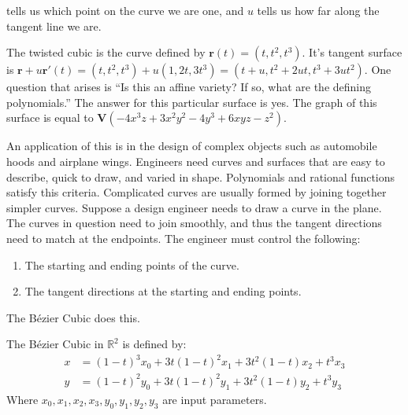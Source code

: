                 tells us which point on the curve we are one, and $u$
                tells us how far along the tangent line we are.
                \begin{example}
                    The twisted cubic is the curve defined by
                    $\mathbf{r}(t)=(t,t^2,t^3)$. It's tangent surface is
                    $\mathbf{r}+u\mathbf{r}'(t)%
                     =(t,t^2,t^3)+u(1,2t,3t^3)%
                     =(t+u,t^2+2ut,t^3+3ut^2)$.
                    One question that arises is ``Is this an affine variety?
                    If so, what are the defining polynomials.''
                    The answer for this particular surface is yes.
                    The graph of this surface is equal to
                    $\mathbf{V}(-4x^3z+3x^2y^2-4y^3+6xyz-z^2)$.
                \end{example}
                An application of this is in the design of
                complex objects such as automobile hoods and
                airplane wings. Engineers need curves and surfaces
                that are easy to describe, quick to draw, and varied
                in shape. Polynomials and rational functions satisfy
                this criteria. Complicated curves are usually
                formed by joining together simpler curves. Suppose
                a design engineer needs to draw a curve in the plane.
                The curves in question need to join smoothly, and
                thus the tangent directions need to match at the
                endpoints. The engineer must control the following:
                \begin{enumerate}
                    \item The starting and ending
                          points of the curve.
                    \item The tangent directions
                          at the starting and ending points.
                \end{enumerate}
                The B\'{e}zier Cubic does this.
                \begin{definition}
                    The B\'{e}zier Cubic in $\mathbb{R}^2$
                    is defined by:
                    \begin{align*}
                        x&=(1-t)^{3}x_0
                          +3t(1-t)^2x_1
                          +3t^2(1-t)x_2+t^3x_3\\
                        y&=(1-t)^{2}y_0
                          +3t(1-t)^2y_1
                          +3t^2(1-t)y_2+t^3y_3
                    \end{align*}
                    Where $x_0,x_1,x_2,x_3,y_0,y_1,y_2,y_3$
                    are input parameters.
                \end{definition}
